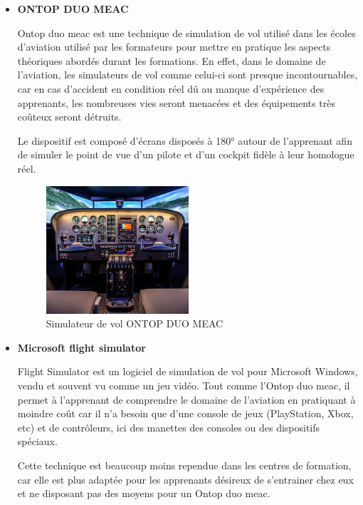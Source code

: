 \begin{itemize}
	\item \textbf{ONTOP DUO MEAC}

	      Ontop duo meac est une technique de simulation de vol utilisé dans les écoles d’aviation utilisé par les formateurs pour mettre en pratique les aspects théoriques abordés durant les formations. 
		  En effet, dans le domaine de l’aviation, les simulateurs de vol comme celui-ci sont presque incontournables, car en cas d’accident en condition réel dû au manque d’expérience des apprenants, les nombreuses vies seront menacées et des équipements très coûteux seront détruits.

	      Le dispositif est composé d'écrans disposés à 180° autour de l’apprenant afin de simuler le point de vue d’un pilote et d’un cockpit fidèle à leur homologue réel.

	      \begin{figure}[H]
		      \centering
		      \includegraphics[width=0.5\textwidth]{img/svol1}
		      \caption{Simulateur de vol ONTOP DUO MEAC}
		      \label{fig:mesh1}
	      \end{figure}

	\item \textbf{Microsoft flight simulator}

	      Flight Simulator est un logiciel de simulation de vol pour Microsoft Windows, vendu et souvent vu comme un jeu vidéo. Tout comme l'Ontop duo meac, il permet à l'apprenant de comprendre le domaine de l’aviation en pratiquant à moindre coût car il n’a besoin que d’une console de jeux (PlayStation, Xbox, etc) et de contrôleurs, ici des manettes des consoles ou des dispositifs spéciaux.

	      Cette technique est beaucoup moins rependue dans les centres de formation, car elle est plus adaptée pour les apprenants désireux de s’entrainer chez eux et ne disposant pas des moyens pour un Ontop duo meac.


\end{itemize}
